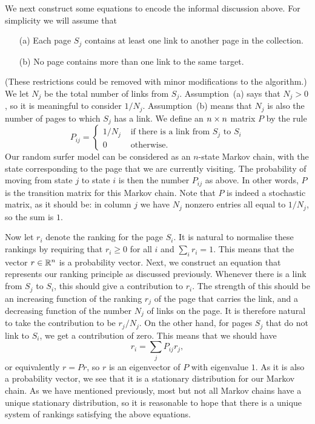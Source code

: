\documentclass[reqno]{amsart}
\theoremstyle{definition}
\newcommand{\idx}[1]{{#1}\index{#1}}
\begin{document}
We next construct some equations to encode the informal discussion
above.  For simplicity we will assume that 
\begin{itemize}
 \item[(a)] Each page $S_j$ contains at least one link to another page
  in the collection.
 \item[(b)] No page contains more than one link to the same target.
\end{itemize}
(These restrictions could be removed with minor modifications to the
algorithm.)  We let $N_j$ be the total number of links from $S_j$.
Assumption~(a) says that $N_j>0$, so it is meaningful to consider
$1/N_j$.  Assumption~(b) means that $N_j$ is also the number of pages
to which $S_j$ has a link.  We define an $n\times n$ matrix $P$ by the
rule 
\[ P_{ij} = \begin{cases}
     1/N_j & \text{ if there is a link from $S_j$ to $S_i$} \\
     0     & \text{ otherwise. } 
   \end{cases}
\]
Our random surfer model can be considered as an $n$-state Markov
chain, with the state corresponding to the page that we are currently
visiting.  The probability of moving from state $j$ to state $i$ is
then the number $P_{ij}$ as above.  In other words, $P$ is the
\idx{transition matrix} 
for this Markov chain.  Note that $P$ is indeed a
stochastic matrix, as it should be: in column $j$ we have $N_j$
nonzero entries all equal to $1/N_j$, so the sum is $1$.

Now let $r_i$ denote the ranking for the page $S_i$.  It is natural to
normalise these rankings by requiring that $r_i\geq 0$ for all $i$ and
$\sum_ir_i=1$.  This means that the vector $r\in{\mathbb{R}}^n$ is a probability
vector.  Next, we construct an equation that represents our ranking
principle as discussed previously.  Whenever there is a link from
$S_j$ to $S_i$, this should give a contribution to $r_i$.  The
strength of this should be an increasing function of the ranking $r_j$
of the page that carries the link, and a decreasing function of the
number $N_j$ of links on the page.  It is therefore natural to take
the contribution to be $r_j/N_j$.  On the other hand, for pages $S_j$
that do not link to $S_i$, we get a contribution of zero.  This means
that we should have
\[ r_i = \sum_j P_{ij}r_j, \]
or equivalently $r=Pr$, so $r$ is an eigenvector of $P$ with
eigenvalue $1$.  As it is also a probability vector, we see that it is
a stationary distribution for our Markov chain.  As we have mentioned
previously, most but not all Markov chains have a unique stationary
distribution, so it is reasonable to hope that there is a unique
system of rankings satisfying the above equations.
\end{document}
